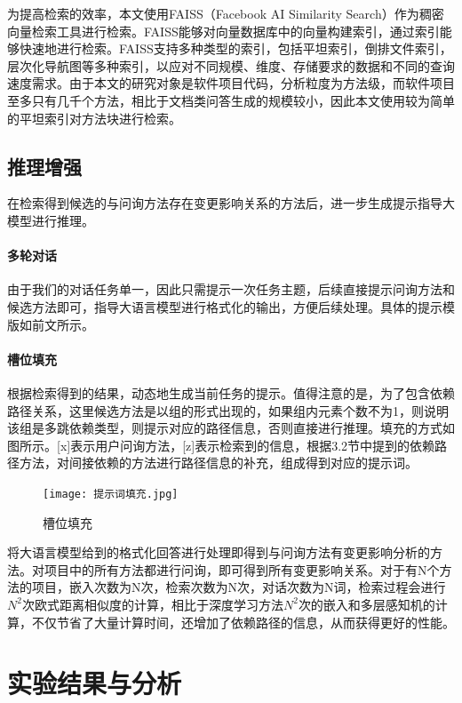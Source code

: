 为提高检索的效率，本文使用FAISS（Facebook AI Similarity Search）作为稠密向量检索工具进行检索。FAISS能够对向量数据库中的向量构建索引，通过索引能够快速地进行检索。FAISS支持多种类型的索引，包括平坦索引，倒排文件索引，层次化导航图等多种索引，以应对不同规模、维度、存储要求的数据和不同的查询速度需求。由于本文的研究对象是软件项目代码，分析粒度为方法级，而软件项目至多只有几千个方法，相比于文档类问答生成的规模较小，因此本文使用较为简单的平坦索引对方法块进行检索。


\subsection{推理增强}

在检索得到候选的与问询方法存在变更影响关系的方法后，进一步生成提示指导大模型进行推理。


\paragraph{多轮对话} 由于我们的对话任务单一，因此只需提示一次任务主题，后续直接提示问询方法和候选方法即可，指导大语言模型进行格式化的输出，方便后续处理。具体的提示模版如前文所示。


\paragraph{槽位填充} 根据检索得到的结果，动态地生成当前任务的提示。值得注意的是，为了包含依赖路径关系，这里候选方法是以组的形式出现的，如果组内元素个数不为1，则说明该组是多跳依赖类型，则提示对应的路径信息，否则直接进行推理。填充的方式如图所示。[x]表示用户问询方法，[z]表示检索到的信息，根据3.2节中提到的依赖路径方法，对间接依赖的方法进行路径信息的补充，组成得到对应的提示词。

\begin{figure}[h]
\centering
\texttt{[image: 提示词填充.jpg]}
\caption{槽位填充}
\end{figure}

将大语言模型给到的格式化回答进行处理即得到与问询方法有变更影响分析的方法。对项目中的所有方法都进行问询，即可得到所有变更影响关系。对于有N个方法的项目，嵌入次数为N次，检索次数为N次，对话次数为N词，检索过程会进行 $N^2$次欧式距离相似度的计算，相比于深度学习方法$N^2$次的嵌入和多层感知机的计算，不仅节省了大量计算时间，还增加了依赖路径的信息，从而获得更好的性能。


\section{实验结果与分析}

